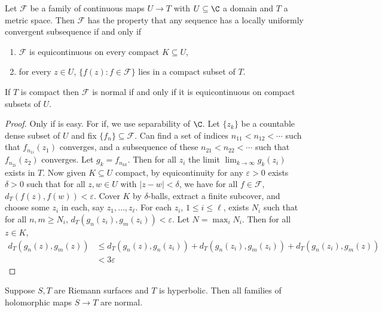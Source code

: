 \documentclass[a4paper]{article}
\begin{document}
\begin{theorem}
  Let \(\mathcal F\) be a family of continuous maps \(U \to T\) with \(U \subseteq \C\) a domain and \(T\) a metric space. Then \(\mathcal F\) has the property that any sequence has a locally uniformly convergent subsequence if and only if
  \begin{enumerate}
  \item \(\mathcal F\) is equicontinuous on every compact \(K \subseteq U\),
  \item for every \(z \in U\), \(\{f(z): f \in \mathcal F\}\) lies in a compact subset of \(T\).
  \end{enumerate}
\end{theorem}

\begin{corollary}
  If \(T\) is compact then \(\mathcal F\) is normal if and only if it is equicontinuous on compact subsets of \(U\).
\end{corollary}

\begin{proof}
  Only if is easy. For if, we use separability of \(\C\). Let \(\{z_k\}\) be a countable dense subset of \(U\) and fix \(\{f_n\} \subseteq \mathcal F\). Can find a set of indices \(n_{11} < n_{12} < \cdots\) such that \(f_{n_{1i}}(z_1)\) converges, and a subsequence of these \(n_{21} < n_{22} < \cdots\) such that \(f_{n_{2i}}(z_2)\) converges. Let \(g_k = f_{n_{kk}}\). Then for all \(z_i\) the limit \(\lim_{k \to \infty} g_k(z_i)\) exists in \(T\). Now given \(K \subseteq U\) compact, by equicontinuity for any \(\varepsilon > 0\) exists \(\delta > 0\) such that for all \(z, w \in U\) with \(|z - w| < \delta\), we have for all \(f \in \mathcal F\), \(d_T(f(z), f(w)) < \varepsilon\). Cover \(K\) by \(\delta\)-balls, extract a finite subcover, and choose some \(z_i\) in each, say \(z_1, \dots, z_\ell\). For each \(z_i\), \(1 \leq i \leq \ell\), exists \(N_i\) such that for all \(n, m \geq N_i\), \(d_T(g_n(z_i), g_m(z_i)) < \varepsilon\). Let \(N = \max_i N_i\). Then for all \(z \in K\),
  \begin{align*}
    d_T(g_n(z), g_m(z))
    &\leq d_T(g_n(z), g_n(z_i)) + d_T(g_n(z_i), g_m(z_i)) + d_T(g_n(z_i), g_m(z)) \\
    &< 3\varepsilon
  \end{align*}
\end{proof}

\begin{theorem}[Montel]
  Suppose \(S, T\) are Riemann surfaces and \(T\) is hyperbolic. Then all families of holomorphic maps \(S \to T\) are normal.
\end{theorem}
\end{document}
